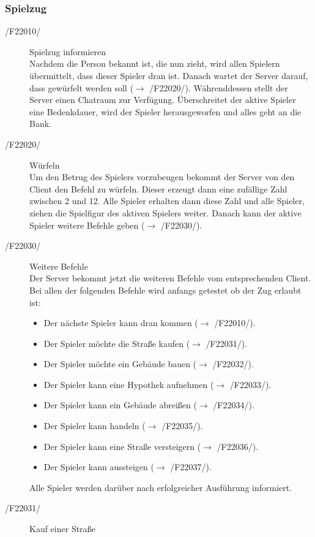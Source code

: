 \documentclass[a4paper,10pt]{article}
\begin{document}
\subsubsection{Spielzug}
\begin{description}
\item[/F22010/] Spielzug informieren \\
Nachdem die Person bekannt ist, die nun zieht, wird allen Spielern übermittelt, dass dieser Spieler dran ist. Danach wartet der Server darauf, dass gewürfelt werden soll ($\rightarrow$ /F22020/). Währenddessen stellt der Server einen Chatraum zur Verfügung. Überschreitet der aktive Spieler eine Bedenkdauer, wird der Spieler herausgeworfen und alles geht an die Bank.
\item[/F22020/] Würfeln \\
Um den Betrug des Spielers vorzubeugen bekommt der Server von den Client den Befehl zu würfeln. Dieser erzeugt dann eine zufällige Zahl zwischen 2 und 12. Alle Spieler erhalten dann diese Zahl und alle Spieler, ziehen die Spielfigur des aktiven Spielers weiter. Danach kann der aktive Spieler weitere Befehle geben ($\rightarrow$ /F22030/).
\item[/F22030/] Weitere Befehle \\
Der Server bekommt jetzt die weiteren Befehle vom entsprechenden Client. Bei allen der folgenden Befehle wird anfangs getestet ob der Zug erlaubt ist:
\begin{itemize}
\item Der nächste Spieler kann dran kommen ($\rightarrow$ /F22010/).
\item Der Spieler möchte die Straße kaufen ($\rightarrow$ /F22031/).
\item Der Spieler möchte ein Gebäude bauen ($\rightarrow$ /F22032/).
\item Der Spieler kann eine Hypothek aufnehmen ($\rightarrow$ /F22033/).
\item Der Spieler kann ein Gebäude abreißen ($\rightarrow$ /F22034/).
\item Der Spieler kann handeln ($\rightarrow$ /F22035/).
\item Der Spieler kann eine Straße versteigern ($\rightarrow$ /F22036/).
\item Der Spieler kann aussteigen ($\rightarrow$ /F22037/).
\end{itemize}
Alle Spieler werden darüber nach erfolgreicher Ausführung informiert.
\item[/F22031/] Kauf einer Straße \\

\end{description}
\end{document}
